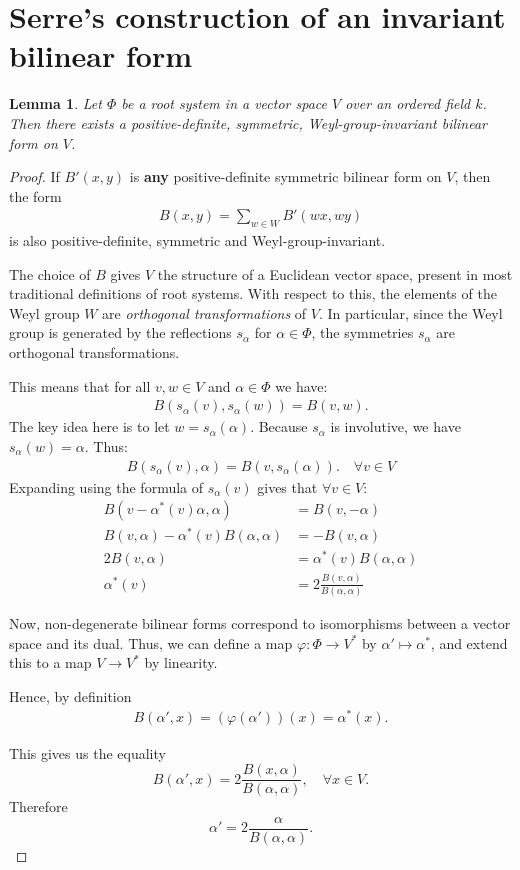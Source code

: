 \documentclass[12pt, a4paper]{article}
\newtheorem{lemma}{Lemma}[section]
\begin{document}
\section{Serre's construction of an invariant bilinear form}

\begin{lemma}
  Let $\Phi$ be a root system in a vector space $V$ over an ordered field $k$. Then there exists a
  positive-definite, symmetric, Weyl-group-invariant bilinear form on $V$.
\end{lemma}
\begin{proof}

  If $B'(x, y)$ is \textbf{any} positive-definite symmetric bilinear form on $V$, then the form
  \begin{align*}
    B(x, y) = \sum_{w \in W}B'(wx, wy)
  \end{align*}
  is also positive-definite, symmetric and Weyl-group-invariant.

  The choice of $B$ gives $V$ the structure of a Euclidean vector space,
  present in most traditional definitions of root systems. With respect to this,
  the elements of the Weyl group $W$ are \emph{orthogonal transformations} of $V$.
  In particular, since the Weyl group is generated by the reflections $s_\alpha$
  for $\alpha \in \Phi$, the symmetries $s_\alpha$ are orthogonal transformations.

  This means that for all $v, w \in V$ and $\alpha \in \Phi$ we have:
  \begin{align*}
    B(s_\alpha(v), s_\alpha(w)) = B(v, w).
  \end{align*}
  The key idea here is to let $w = s_\alpha(\alpha)$. Because $s_\alpha$ is
  involutive, we have $s_\alpha(w) = \alpha$. Thus:
  \begin{align*}
    B(s_\alpha(v), \alpha) = B(v, s_\alpha(\alpha)). \quad \forall v \in V
  \end{align*}
  Expanding using the formula of $s_\alpha(v)$ gives that $\forall v \in V$:
  \begin{align*}
    B(v - \alpha^*(v)\alpha, \alpha) &= B(v, -\alpha)  \\
    B(v, \alpha) - \alpha^*(v)B(\alpha, \alpha) &= -B(v, \alpha) \\
    2B(v, \alpha) &= \alpha^*(v)B(\alpha, \alpha) \\
    \alpha^*(v) &= 2\frac{B(v, \alpha)}{B(\alpha, \alpha)}
  \end{align*}

  Now, non-degenerate bilinear forms correspond to isomorphisms between a vector space and its
  dual. Thus, we can define a map $\varphi : \Phi \to V^*$ by $\alpha' \mapsto \alpha^*$, and extend this to
  a map $V \to V^*$ by linearity.

  Hence, by definition
  \begin{align*}
    B(\alpha', x) = (\varphi(\alpha'))(x) = \alpha^*(x).
  \end{align*}

  This gives us the equality
  \[
    B(\alpha', x) = 2\frac{B(x, \alpha)}{B(\alpha, \alpha)}, \quad \forall x \in V.
  \]
  Therefore
  \[
    \alpha' = 2\frac{\alpha}{B(\alpha, \alpha)}.
  \]

\end{proof}



\end{document}
